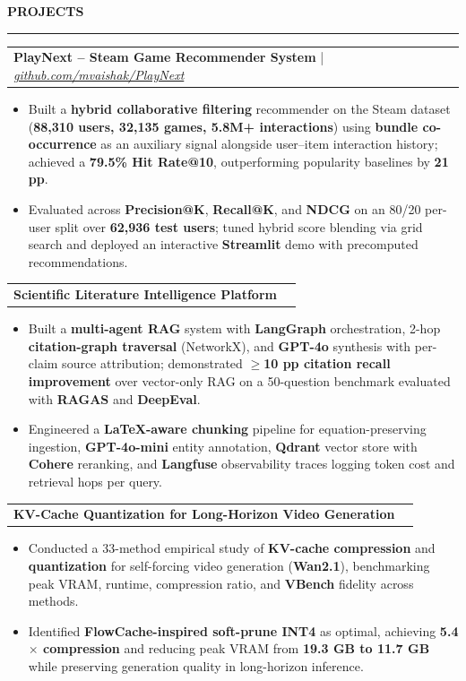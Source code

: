 \documentclass[10pt]{article}
\makeatletter
\newcommand{\resumesection}[1]{%
  \vspace{4pt}%
  {\bfseries\normalsize\MakeUppercase{#1}}\\[-2pt]
  \hrule
  \vspace{2pt}%
}
\newcommand{\twoCol}[2]{%
  \begin{tabular*}{\textwidth}{@{\extracolsep{\fill}} l r}
    #1 & #2 \\
  \end{tabular*}
}
\newcommand{\bulletListStart}{\begin{itemize}[leftmargin=0.15in, labelsep=0.08in, itemsep=0pt, topsep=1pt, parsep=0pt, partopsep=0pt]}
\newcommand{\bulletListEnd}{\end{itemize}}
\makeatother
\begin{document}
\resumesection{Projects}

\twoCol{\textbf{PlayNext -- Steam Game Recommender System} \;|\; \href{https://github.com/mvaishak/PlayNext}{\textit{github.com/mvaishak/PlayNext}}}{}
\bulletListStart
  \item Built a \textbf{hybrid collaborative filtering} recommender on the Steam dataset (\textbf{88,310 users, 32,135 games, 5.8M+ interactions}) using \textbf{bundle co-occurrence} as an auxiliary signal alongside user--item interaction history; achieved a \textbf{79.5\% Hit Rate@10}, outperforming popularity baselines by \textbf{21 pp}.
  \item Evaluated across \textbf{Precision@K}, \textbf{Recall@K}, and \textbf{NDCG} on an 80/20 per-user split over \textbf{62,936 test users}; tuned hybrid score blending via grid search and deployed an interactive \textbf{Streamlit} demo with precomputed recommendations.
\bulletListEnd

\vspace{2pt}
\twoCol{\textbf{Scientific Literature Intelligence Platform}}{}
\bulletListStart
  \item Built a \textbf{multi-agent RAG} system with \textbf{LangGraph} orchestration, 2-hop \textbf{citation-graph traversal} (NetworkX), and \textbf{GPT-4o} synthesis with per-claim source attribution; demonstrated $\geq$\textbf{10 pp citation recall improvement} over vector-only RAG on a 50-question benchmark evaluated with \textbf{RAGAS} and \textbf{DeepEval}.
  \item Engineered a \textbf{LaTeX-aware chunking} pipeline for equation-preserving ingestion, \textbf{GPT-4o-mini} entity annotation, \textbf{Qdrant} vector store with \textbf{Cohere} reranking, and \textbf{Langfuse} observability traces logging token cost and retrieval hops per query.
\bulletListEnd

\vspace{2pt}
\twoCol{\textbf{KV-Cache Quantization for Long-Horizon Video Generation}}{}
\bulletListStart
  \item Conducted a 33-method empirical study of \textbf{KV-cache compression} and \textbf{quantization} for self-forcing video generation (\textbf{Wan2.1}), benchmarking peak VRAM, runtime, compression ratio, and \textbf{VBench} fidelity across methods.
  \item Identified \textbf{FlowCache-inspired soft-prune INT4} as optimal, achieving \textbf{5.4$\times$ compression} and reducing peak VRAM from \textbf{19.3 GB to 11.7 GB} while preserving generation quality in long-horizon inference.
\bulletListEnd
\end{document}
